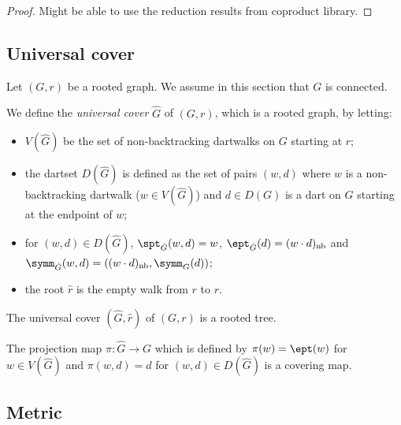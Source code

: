 \begin{proof}
  Might be able to use the reduction results from coproduct library.
\end{proof}

\subsection{Universal cover}

Let $(G,r)$ be a rooted graph. We assume in this section that $G$ is connected.

\begin{definition}
  \label{def:universal_cover}
  We define the \emph{universal cover} $\hat{G}$ of $(G,r)$, which is a rooted graph,
  by letting:
  \begin{itemize}
    \item $V(\hat G)$ be the set of non-backtracking dartwalks on $G$
    starting at $r$;
    \item the dartset $D(\hat{G})$ is defined as the set of pairs $(w,d)$ where
    $w$ is a non-backtracking dartwalk ($w \in V(\hat{G})$) and $d \in D(G)$
    is a dart on $G$ starting at the endpoint of $w$;
    \item for $(w,d) \in D(\hat{G})$, $\spt_{\hat{G}}(w,d) = w$,
    $\ept_{\hat{G}}(d) = (w \cdot d)_{\mathrm{nb}}$ and $\symm_{\hat{G}}(w,d) =
     ((w \cdot d)_{\mathrm{nb}},\symm_G(d))$;
    \item the root $\hat{r}$ is the empty walk from $r$ to $r$.
  \end{itemize}
\end{definition}

\begin{theorem}
  \label{thm:univ_cover_is_tree}
  The universal cover $(\hat{G}, \hat{r})$ of $(G,r)$ is a rooted tree.
\end{theorem}

\begin{theorem}
  \label{thm:univ_cover_cover}
  The projection map $\pi : \hat{G} \rightarrow G$ which is defined by $\pi(w)=\ept(w)$
  for $w \in V(\hat G)$ and $\pi(w,d)=d$ for $(w,d) \in D(\hat G)$ is a covering map.
\end{theorem}

\subsection{Metric}

